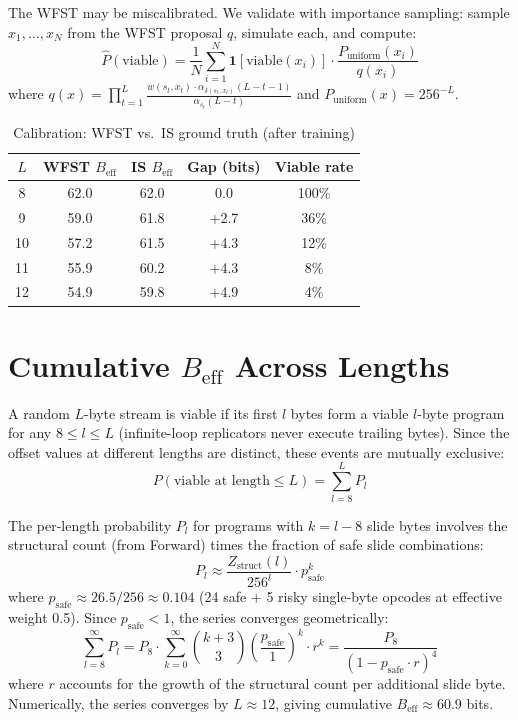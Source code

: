 \documentclass{article}
\newcommand{\Beff}{B_{\mathrm{eff}}}
\begin{document}
The WFST may be miscalibrated. We validate with importance sampling:
sample $x_1, \ldots, x_N$ from the WFST proposal $q$, simulate each,
and compute:
\begin{equation}
\hat{P}(\text{viable}) = \frac{1}{N} \sum_{i=1}^{N}
\mathbf{1}[\text{viable}(x_i)] \cdot \frac{P_{\text{uniform}}(x_i)}{q(x_i)}
\end{equation}
where $q(x) = \prod_{t=1}^{L} \frac{w(s_t, x_t) \cdot \alpha_{\delta(s_t, x_t)}(L-t-1)}{\alpha_{s_t}(L-t)}$ and $P_{\text{uniform}}(x) = 256^{-L}$.

\begin{table}[h]
\centering
\caption{Calibration: WFST vs.\ IS ground truth (after training)}
\begin{tabular}{ccccc}
\toprule
$L$ & WFST $\Beff$ & IS $\Beff$ & Gap (bits) & Viable rate \\
\midrule
8  & 62.0 & 62.0 & 0.0  & 100\% \\
9  & 59.0 & 61.8 & +2.7 & 36\% \\
10 & 57.2 & 61.5 & +4.3 & 12\% \\
11 & 55.9 & 60.2 & +4.3 & 8\% \\
12 & 54.9 & 59.8 & +4.9 & 4\% \\
\bottomrule
\end{tabular}
\label{tab:calibration}
\end{table}

\section{Cumulative $\Beff$ Across Lengths}

A random $L$-byte stream is viable if its first $l$ bytes form a viable
$l$-byte program for any $8 \le l \le L$ (infinite-loop replicators
never execute trailing bytes). Since the offset values at different
lengths are distinct, these events are mutually exclusive:
\begin{equation}
P(\text{viable at length} \le L) = \sum_{l=8}^{L} P_l
\end{equation}

The per-length probability $P_l$ for programs with $k = l - 8$ slide
bytes involves the structural count (from Forward) times the fraction
of safe slide combinations:
\begin{equation}
P_l \approx \frac{Z_{\text{struct}}(l)}{256^l} \cdot p_{\text{safe}}^k
\end{equation}
where $p_{\text{safe}} \approx 26.5/256 \approx 0.104$ (24 safe +
5 risky single-byte opcodes at effective weight 0.5). Since
$p_{\text{safe}} < 1$, the series converges geometrically:
\begin{equation}
\sum_{l=8}^{\infty} P_l = P_8 \cdot \sum_{k=0}^{\infty}
\binom{k+3}{3} \left(\frac{p_{\text{safe}}}{1}\right)^k
\cdot r^k = \frac{P_8}{(1 - p_{\text{safe}} \cdot r)^4}
\end{equation}
where $r$ accounts for the growth of the structural count per
additional slide byte. Numerically, the series converges by
$L \approx 12$, giving cumulative $\Beff \approx 60.9$ bits.
\end{document}
